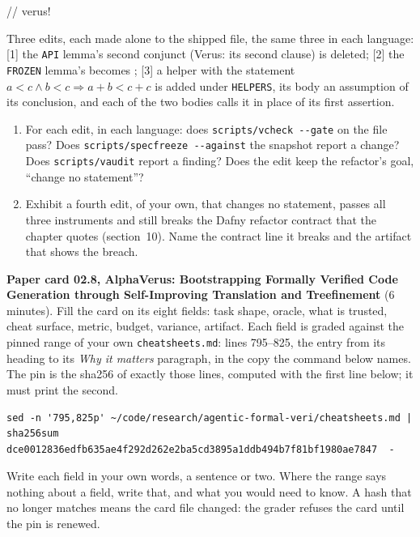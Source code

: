 \documentclass[11pt]{article}
\begin{document}
\begin{problem}[concept]
\begin{veruscode}
{} // verus!
\end{veruscode}
Three edits, each made alone to the shipped file, the same three in each
language: [1] the \texttt{API} lemma's second  conjunct (Verus:
its second  clause) is deleted; [2] the \texttt{FROZEN} lemma's
\dfy{<} becomes \dfy{<=}; [3] a helper with the statement
$a < c \wedge b < c \Rightarrow a + b < c + c$ is added under
\texttt{HELPERS}, its body an assumption of its conclusion, and each of the two
bodies calls it in place of its first assertion.
\begin{enumerate}
\item[(a)] For each edit, in each language: does \verb+scripts/vcheck --gate+
  on the file pass? Does \verb+scripts/specfreeze --against+ the snapshot
  report a change? Does \texttt{scripts/vaudit} report a finding? Does the
  edit keep the refactor's goal, ``change no statement''?
\item[(b)] Exhibit a fourth edit, of your own, that changes no statement,
  passes all three instruments and still breaks the Dafny refactor contract
  that the chapter quotes (section~10). Name the contract line it breaks and
  the artifact that shows the breach.
\end{enumerate}
\end{problem}

\begin{problem}\label{prob:B3}
\textbf{Paper card 02.8, AlphaVerus: Bootstrapping Formally Verified Code
Generation through Self-Improving Translation and Treefinement} (6 minutes).
Fill the card on its eight fields: task shape, oracle, what is trusted, cheat
surface, metric, budget, variance, artifact. Each field is graded against the
pinned range of your own \texttt{cheatsheets.md}: lines 795--825, the entry
from its heading to its \emph{Why it matters} paragraph, in the copy the
command below names. The pin is the sha256 of exactly those lines, computed
with the first line below; it must print the second.
{\small
\begin{verbatim}
sed -n '795,825p' ~/code/research/agentic-formal-veri/cheatsheets.md | sha256sum
dce0012836edfb635ae4f292d262e2ba5cd3895a1ddb494b7f81bf1980ae7847  -
\end{verbatim}
}
Write each field in your own words, a sentence or two. Where the range says
nothing about a field, write that, and what you would need to know. A hash
that no longer matches means the card file changed: the grader refuses the
card until the pin is renewed.
\end{problem}
\end{document}

